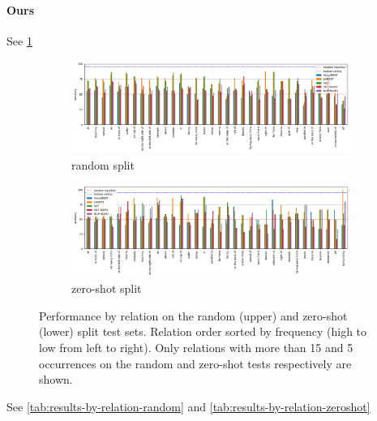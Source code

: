 \paragraph{Ours}

See \cref{fig:performance_by_rel}

\begin{figure}[ht]
    \centering
\begin{subfigure}[b]{\linewidth}
    \centering
    \includegraphics[width=\linewidth]{images/visual-spatial-reasoning/performance_rel_random.png}
    \vspace{-1cm}
    \caption{random split}
\end{subfigure}
\begin{subfigure}[b]{\linewidth}
    \centering
    \includegraphics[width=\linewidth]{images/visual-spatial-reasoning/performance_rel_zeroshot.png}
    \vspace{-1cm}
    \caption{zero-shot split}
\end{subfigure}
\caption{Performance by relation on the random (upper) and zero-shot (lower) split test sets. Relation order sorted by frequency (high to low from left to right). Only relations with more than 15 and 5 occurrences on the random and zero-shot tests respectively are shown. }
    \label{fig:performance_by_rel}
\end{figure}

See \cref{tab:results-by-relation-random} and \cref{tab:results-by-relation-zeroshot}

